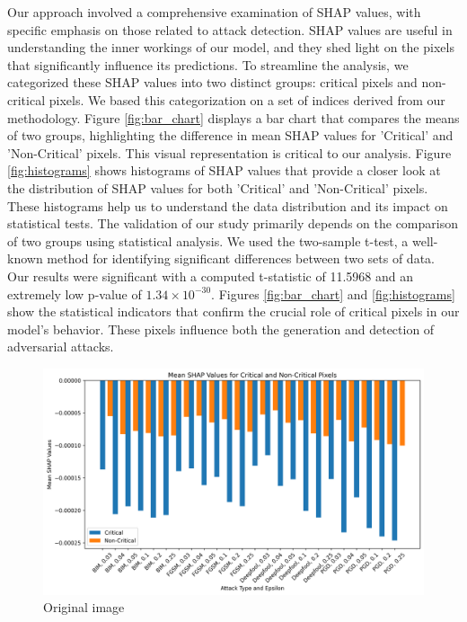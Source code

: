 \documentclass[10pt, conference, a4paper, final]{IEEEtran}
\begin{document}
    Our approach involved a comprehensive examination of SHAP values, with specific emphasis on those related to attack detection. SHAP values are useful in understanding the inner workings of our model, and they shed light on the pixels that significantly influence its predictions. To streamline the analysis, we categorized these SHAP values into two distinct groups: critical pixels and non-critical pixels. We based this categorization on a set of indices derived from our methodology.
    Figure \ref{fig:bar_chart} displays a bar chart that compares the means of two groups, highlighting the difference in mean SHAP values for 'Critical' and 'Non-Critical' pixels. This visual representation is critical to our analysis.   
    Figure \ref{fig:histograms} shows histograms of SHAP values that provide a closer look at the distribution of SHAP values for both 'Critical' and 'Non-Critical' pixels. These histograms help us to understand the data distribution and its impact on statistical tests.    
    The validation of our study primarily depends on the comparison of two groups using statistical analysis. We used the two-sample t-test, a well-known method for identifying significant differences between two sets of data. Our results were significant with a computed t-statistic of 11.5968 and an extremely low p-value of $1.34 \times 10^{-30}$. Figures \ref{fig:bar_chart} and \ref{fig:histograms} show the statistical indicators that confirm the crucial role of critical pixels in our model's behavior. These pixels influence both the generation and detection of adversarial attacks.
    
 
        \begin{figure}
            \centering
            \includegraphics[width=\linewidth]{paper_images/Mean_SHAP_Values.png}
            \caption{Original image}
        \end{figure}
     
\end{document}
